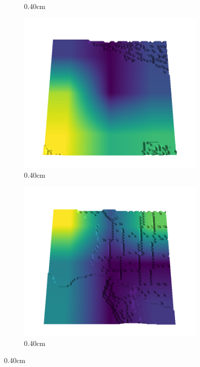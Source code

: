 \documentclass[../document.tex]{subfiles}
\begin{document}
\begin{figure}[H]
\begin{subfigure}[b]{0.242\linewidth}
    \caption{0.40cm}
    \end{subfigure}
    \begin{subfigure}[b]{0.242\linewidth}
    \includegraphics[width=\linewidth]{../img/5/quarry/best/68-patch-3d-majavi-colormap-90.png}
    \caption{0.40cm}
    \end{subfigure}
    \begin{subfigure}[b]{0.242\linewidth}
    \includegraphics[width=\linewidth]{../img/5/quarry/best/71-patch-3d-majavi-colormap-95.png}
    \caption{0.40cm}
    \end{subfigure}
    \end{figure}
\end{document}
